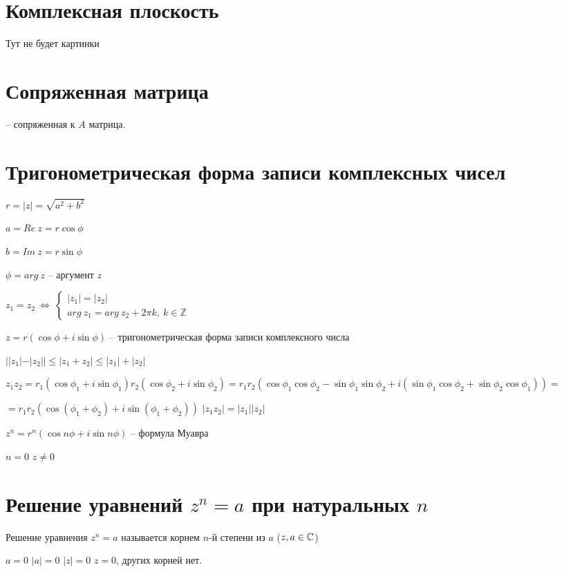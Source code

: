 \section{Комплексная плоскость}
Тут не будет картинки
\section{Сопряженная матрица}

 -- сопряженная к $A$ матрица.
\section{Тригонометрическая  форма записи комплексных чисел}
$r=|z|=\sqrt{a^2+b^2}$

$a=Re\ z=r\cos\phi$

$b=Im\ z=r\sin\phi$

$\phi=arg\ z$ -- аргумент $z$

$z_1=z_2\ \Leftrightarrow\ \left\{\begin{matrix}|z_1|=|z_2|\\arg\ z_1=arg\ z_2+2\pi k,\ k\in\mathbb{Z}\end{matrix}\right.$

$z=r(\cos\phi+i\sin\phi)$ -- тригонометрическая форма записи комплексного числа

\begin{stat}
$||z_1|-|z_2||\leq|z_1+z_2|\leq|z_1|+|z_2|$
\end{stat}
$z_1z_2=r_1(\cos\phi_1+i\sin\phi_1)r_2(\cos\phi_2+i\sin\phi_2)=r_1r_2(\cos\phi_1\cos\phi_2-\sin\phi_1\sin\phi_2+i(\sin\phi_1\cos\phi_2+\sin\phi_2\cos\phi_1))=$

$=r_1r_2(\cos(\phi_1+\phi_2)+i\sin(\phi_1+\phi_2))$
$|z_1z_2|=|z_1||z_2|$
\begin{effect}
$z^n=r^n(\cos n\phi+i\sin n\phi)$ -- формула Муавра
\end{effect}
$n=0$ \then $z\neq0$
\section{Решение уравнений $z^n=a$ при натуральных $n$}
\begin{opred}
Решение уравнения $z^n=a$ называется корнем $n$-й степени из $a$ ($z,a\in\mathbb{C}$)
\end{opred}
$a=0$ \then $|a|=0$ \then $|z|=0$ \then $z=0$, других корней нет.

